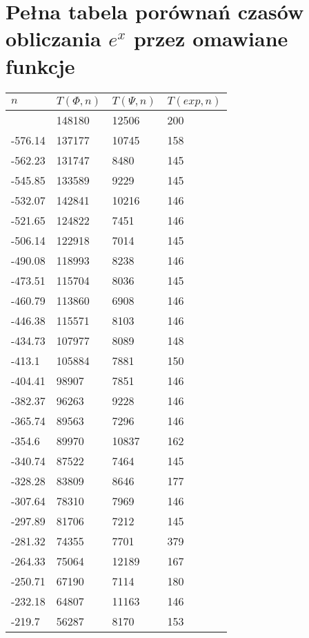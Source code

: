 \documentclass[11pt,wide]{mwart}
\begin{document}
\section{Pełna tabela porównań czasów obliczania $e^x$ przez omawiane funkcje}
\label{sec:appendix}
    \begin{longtable}{|l|l|l|l|}
        \hline
        $n$ & $T(\Phi, n)$ & $T(\Psi, n)$ & $T(exp, n)$\\
        \hline
        \endhead
        \hline
        \endfoot
        -596.17 & 148180 & 12506 & 200 \\
        -576.14 & 137177 & 10745 & 158 \\
        -562.23 & 131747 & 8480 & 145 \\
        -545.85 & 133589 & 9229 & 145 \\
        -532.07 & 142841 & 10216 & 146 \\
        -521.65 & 124822 & 7451 & 146 \\
        -506.14 & 122918 & 7014 & 145 \\
        -490.08 & 118993 & 8238 & 146 \\
        -473.51 & 115704 & 8036 & 145 \\
        -460.79 & 113860 & 6908 & 146 \\
        -446.38 & 115571 & 8103 & 146 \\
        -434.73 & 107977 & 8089 & 148 \\
         -413.1 & 105884 & 7881 & 150 \\
        -404.41 & 98907 & 7851 & 146 \\
        -382.37 & 96263 & 9228 & 146 \\
        -365.74 & 89563 & 7296 & 146 \\
         -354.6 & 89970 & 10837 & 162 \\
        -340.74 & 87522 & 7464 & 145 \\
        -328.28 & 83809 & 8646 & 177 \\
        -307.64 & 78310 & 7969 & 146 \\
        -297.89 & 81706 & 7212 & 145 \\
        -281.32 & 74355 & 7701 & 379 \\
        -264.33 & 75064 & 12189 & 167 \\
        -250.71 & 67190 & 7114 & 180 \\
        -232.18 & 64807 & 11163 & 146 \\
         -219.7 & 56287 & 8170 & 153 \\

\end{longtable}
\end{document}
